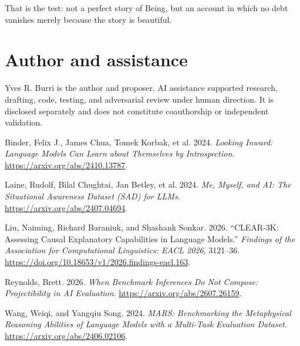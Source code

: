 \documentclass[
  english,
]{article}
\newlength{\cslhangindent}
\newenvironment{CSLReferences}[2] %
 {\begin{list}{}{%
  \setlength{\itemindent}{0pt}
  \setlength{\leftmargin}{0pt}
  \setlength{\parsep}{0pt}
  \ifodd #1
   \setlength{\leftmargin}{\cslhangindent}
   \setlength{\itemindent}{-1\cslhangindent}
  \fi
  \setlength{\itemsep}{#2\baselineskip}}}
 {\end{list}}
\begin{document}
That is the test: not a perfect story of Being, but an account in which
no debt vanishes merely because the story is beautiful.

\section{Author and assistance}\label{author-and-assistance}

Yves R. Burri is the author and proposer. AI assistance supported
research, drafting, code, testing, and adversarial review under human
direction. It is disclosed separately and does not constitute
coauthorship or independent validation.

\protect{}\label{refs}
\begin{CSLReferences}{1}{1}
Binder, Felix J., James Chua, Tomek Korbak, et al. 2024. \emph{Looking
Inward: Language Models Can Learn about Themselves by Introspection}.
\url{https://arxiv.org/abs/2410.13787}.

Laine, Rudolf, Bilal Chughtai, Jan Betley, et al. 2024. \emph{Me,
Myself, and AI: The Situational Awareness Dataset (SAD) for LLMs}.
\url{https://arxiv.org/abs/2407.04694}.

Liu, Naiming, Richard Baraniuk, and Shashank Sonkar. 2026.
{``{CLEAR}-3{K}: Assessing Causal Explanatory Capabilities in Language
Models.''} \emph{Findings of the Association for Computational
Linguistics: EACL 2026}, 3121--36.
\url{https://doi.org/10.18653/v1/2026.findings-eacl.163}.

Reynolds, Brett. 2026. \emph{When Benchmark Inferences Do Not Compose:
Projectibility in AI Evaluation}.
\url{https://arxiv.org/abs/2607.26159}.

Wang, Weiqi, and Yangqiu Song. 2024. \emph{{MARS}: Benchmarking the
Metaphysical Reasoning Abilities of Language Models with a Multi-Task
Evaluation Dataset}. \url{https://arxiv.org/abs/2406.02106}.

\end{CSLReferences}
\end{document}
